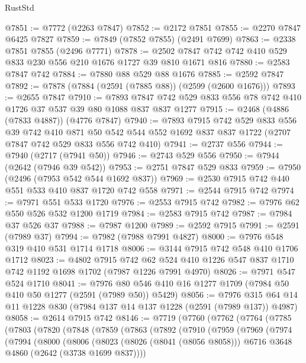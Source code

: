 \begin{lexlean}{RustStd}
\begin{coremodule}
@7851 := @7772 (@2263 @7847)
@7852 := @2172 @7851
@7855 := @2270 @7847 @6425 @7827
@7859 := @7849 (@7852 @7855) (@2491 @7699)
@7863 := @2338 @7851 @7855 (@2496 @7771)
@7878 := @2502 @7847 @742 @742 @410 @529 @833 @230 @556 @210 @1676 @1727 @39 @810 @1671 @816
@7880 := @2583 @7847 @742
@7884 := @7880 @88 @529 @88 @1676
@7885 := @2592 @7847
@7892 := @7878 (@7884 (@2591 (@7885 @88)) (@2599 (@2600 @1676)))
@7893 := @2655 @7847
@7910 := @7893 @7847 @742 @529 @833 @556 @78 @742 @410 @1726 @37 @537 @39 @80 @1088 @837 @837 @1277
@7915 := @2468 (@4886 (@7833 @4887)) (@4776 @7847)
@7940 := @7893
    @7915
    @742
    @529
    @833
    @556
    @39
    @742
    @410
    @871
    @50
    @542
    @544
    @552
    @1692
    @837
    @837
    @1722
    (@2707 @7847 @742 @529 @833 @556 @742 @410)
@7941 := @2737 @556
@7944 := @7940 (@2717 (@7941 @50))
@7946 := @2743 @529 @556
@7950 := @7944 (@2642 (@7946 @39 @542))
@7953 := @2751 @7847 @529 @833
@7959 := @7950 (@2496 (@7953 @542 @544 @1692 @837))
@7969 := @2530 @7915 @742 @440 @551 @533 @410 @837 @1720 @742 @558
@7971 := @2544 @7915 @742
@7974 := @7971 @551 @533 @1720
@7976 := @2553 @7915 @742
@7982 := @7976 @62 @550 @526 @532 @1200 @1719
@7984 := @2583 @7915 @742
@7987 := @7984 @37 @526 @37
@7988 := @7987 @1200
@7989 := @2592 @7915
@7991 := @2591 (@7989 @37)
@7994 := @7982 (@7988 @7991 @4827)
@8000 := @7976 @548 @319 @410 @531 @1714 @1718
@8006 := @3144 @7915 @742 @548 @410 @1706 @1712
@8023 := @4802
    @7915
    @742
    @62
    @524
    @410
    @1226
    @547
    @837
    @1710
    @742
    @1192
    @1698
    @1702
    (@7987 @1226 @7991 @4970)
@8026 := @7971 @547 @524 @1710
@8041 := @7976 @80 @546 @410 @16 @1277 @1709 (@7984 @50 @410 @50 @1277 (@2591 (@7989 @50)) @5429)
@8056 := @7976 @315 @64 @14 @11 @1228 @830 (@7984 @137 @14 @137 @1228 (@2591 (@7989 @137)) @4987)
@8058 := @2614 @7915 @742
@8146 := @7719
    (@7760
      (@7762
        (@7764
          (@7785
            (@7803
              (@7820
                (@7848
                  (@7859
                    (@7863
                      (@7892
                        (@7910
                          (@7959
                            (@7969
                              (@7974
                                (@7994
                                  (@8000
                                    (@8006
                                      (@8023
                                        (@8026 (@8041 (@8056 @8058)))
                                        @6716
                                        @3648
                                        @4860
                                        (@2642 (@3738 @1699 @837))))

\end{coremodule}
\end{lexlean}
